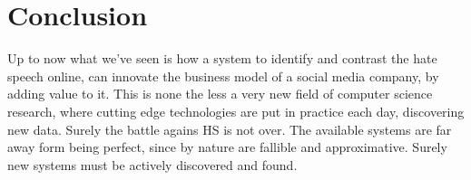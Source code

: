 \section{Conclusion}

Up to now what we've seen is how a system to identify and contrast the
hate speech online, can innovate the business model of a social media
company, by adding value to it. This is none the less a very new field
of computer science research, where cutting edge technologies are put
in practice each day, discovering new data. Surely the battle agains
HS is not over. The available systems are far away form being perfect,
since by nature are fallible and approximative. Surely new systems
must be actively discovered and found.
